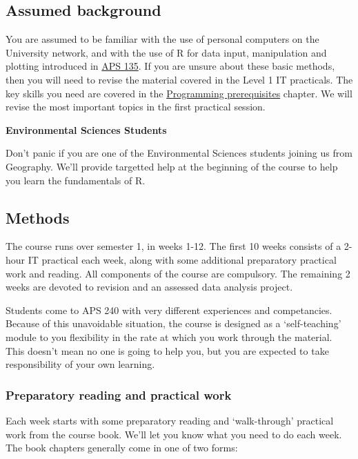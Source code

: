 \documentclass[]{book}
\begin{document}
\subsection{Assumed background}\label{assumed-background}

You are assumed to be familiar with the use of personal computers on the
University network, and with the use of R for data input, manipulation
and plotting introduced in
\href{https://www.shef.ac.uk/aps/currentug/level1/aps135}{APS 135}. If
you are unsure about these basic methods, then you will need to revise
the material covered in the Level 1 IT practicals. The key skills you
need are covered in the
\protect\hyperlink{programming-prerequisites}{Programming prerequisites}
chapter. We will revise the most important topics in the first practical
session.

\begin{do-something}
\textbf{Environmental Sciences Students}

Don't panic if you are one of the Environmental Sciences students
joining us from Geography. We'll provide targetted help at the beginning
of the course to help you learn the fundamentals of R.
\end{do-something}

\subsection{Methods}\label{methods}

The course runs over semester 1, in weeks 1-12. The first 10 weeks
consists of a 2-hour IT practical each week, along with some additional
preparatory practical work and reading. All components of the course are
compulsory. The remaining 2 weeks are devoted to revision and an
assessed data analysis project.

Students come to APS 240 with very different experiences and
competancies. Because of this unavoidable situation, the course is
designed as a `self-teaching' module to you flexibility in the rate at
which you work through the material. This doesn't mean no one is going
to help you, but you are expected to take responsibility of your own
learning.

\subsubsection{Preparatory reading and practical
work}\label{preparatory-reading-and-practical-work}

Each week starts with some preparatory reading and `walk-through'
practical work from the course book. We'll let you know what you need to
do each week. The book chapters generally come in one of two forms:
\end{document}
